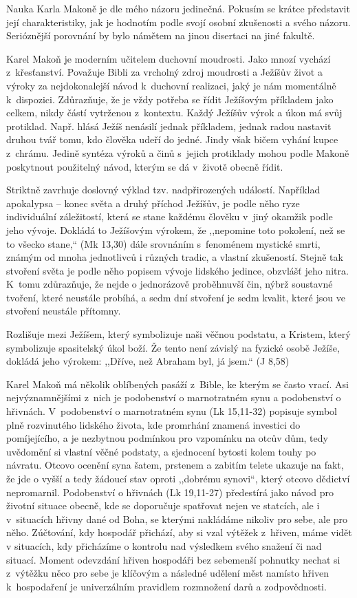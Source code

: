 Nauka Karla Makoně je dle mého názoru jedinečná. Pokusím se krátce představit
její charakteristiky, jak je hodnotím podle svojí osobní zkušenosti a svého
názoru. Serióznější porovnání by bylo námětem na jinou disertaci na jiné
fakultě.

Karel Makoň je moderním učitelem duchovní moudrosti. Jako mnozí vychází z~křesťanství. Považuje Bibli za vrcholný zdroj
moudrosti a Ježíšův život a výroky za nejdokonalejší návod k~duchovní realizaci,
jaký je nám momentálně k~dispozici. Zdůrazňuje, že je vždy potřeba se řídit
Ježíšovým příkladem jako celkem, nikdy částí vytrženou z~kontextu. Každý Ježíšův
výrok a úkon má svůj protiklad. Např. hlásá Ježíš nenásilí jednak příkladem,
jednak radou nastavit druhou tvář tomu, kdo člověka udeří do jedné. Jindy však
bičem vyhání kupce z~chrámu. Jedině syntéza výroků a činů s~jejich protiklady
mohou podle Makoně poskytnout použitelný návod, kterým se dá v~životě obecně
řídit.

Striktně zavrhuje doslovný výklad tzv. nadpřirozených událostí. Například
apokalypsa -- konec světa a druhý příchod Ježíšův, je podle něho ryze individuální záležitostí, která se
stane každému člověku v~jiný okamžik podle jeho vývoje. Dokládá to Ježíšovým
výrokem, že ,,nepomine toto pokolení, než se to všecko stane,`` (Mk 13,30) dále
srovnáním s~fenoménem mystické smrti, známým od mnoha jednotlivců i různých
tradic, a vlastní zkušeností. Stejně tak stvoření světa je podle něho popisem
vývoje lidského jedince, obzvlášť jeho nitra. K~tomu zdůrazňuje, že nejde o
jednorázově proběhnuvší čin, nýbrž soustavné tvoření, které neustále probíhá, a
sedm dní stvoření je sedm kvalit, které jsou ve stvoření neustále přítomny.

Rozlišuje mezi Ježíšem, který symbolizuje naši věčnou podstatu, a Kristem, který
symbolizuje spasitelský úkol boží. Že tento není závislý na fyzické osobě Ježíše,
dokládá jeho výrokem: ,,Dříve, než Abraham byl, já jsem.`` (J 8,58)

Karel Makoň má několik oblíbených pasáží z~Bible, ke kterým se často vrací. Asi
nejvýznamnějšími z~nich je podobenství o marnotratném synu a podobenství o
hřivnách. V~podobenství o marnotratném synu (Lk 15,11-32) popisuje symbol plně rozvinutého
lidského života, kde promrhání znamená investici do pomíjejícího, a je nezbytnou
podmínkou pro vzpomínku na otcův dům, tedy uvědomění si vlastní věčné podstaty, a
sjednocení bytosti kolem touhy po návratu. Otcovo ocenění syna šatem, prstenem a
zabitím telete ukazuje na fakt, že jde o vyšší a tedy žádoucí stav oproti
,,dobrému synovi``, který otcovo dědictví nepromarnil. Podobenství o hřivnách (Lk 19,11-27)
předestírá jako návod pro životní situace obecně, kde se doporučuje spatřovat
nejen ve statcích, ale i v~situacích hřivny dané od Boha, se kterými nakládáme
nikoliv pro sebe, ale pro něho. Zúčtování, kdy hospodář přichází, aby si vzal
výtěžek z~hřiven, máme vidět v situacích, kdy přicházíme o kontrolu nad
výsledkem svého snažení či nad situací. Moment odevzdání hřiven hospodáři bez
sebemenší pohnutky nechat si z~výtěžku něco pro sebe je klíčovým a následné udělení měst
namísto hřiven k~hospodaření je univerzálním pravidlem rozmnožení darů a
zodpovědnosti.

